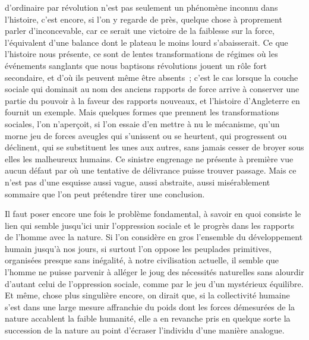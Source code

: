 \documentclass[french,twoside]{book} %
\begin{document}
d'ordinaire par révolution n'est pas seulement un phénomène inconnu dans l'histoire, c'est encore, si l'on y regarde de près, quelque chose à proprement parler d'inconcevable, car ce serait une victoire de la faiblesse sur la force, l'équivalent d'une balance dont le plateau le moins lourd s'abaisserait. Ce que l'histoire nous présente, ce sont de lentes transformations de régimes où les événements sanglants que nous baptisons révolutions jouent un rôle fort secondaire, et d'où ils peuvent même être absents ; c'est le cas lorsque la couche sociale qui dominait au nom des anciens rapports de force arrive à conserver une partie du pouvoir à la faveur des rapports nouveaux, et l'histoire d'Angleterre en fournit un exemple. Mais quelques formes que prennent les transformations sociales, l'on n'aperçoit, si l'on essaie d'en mettre à nu le mécanisme, qu'un morne jeu de forces aveugles qui s'unissent ou se heurtent, qui progressent ou déclinent, qui se substituent les unes aux autres, sans jamais cesser de broyer sous elles les malheureux humains. Ce sinistre engrenage ne présente à première vue aucun défaut par où une tentative de délivrance puisse trouver passage. Mais ce n'est pas d'une esquisse aussi vague, aussi abstraite, aussi misérablement sommaire que l'on peut prétendre tirer une conclusion.\par
Il faut poser encore une fois le problème fondamental, à savoir en quoi consiste le lien qui semble jusqu'ici unir l'oppression sociale et le progrès dans les rapports de l'homme avec la nature. Si l'on considère en gros l'ensemble du développement humain jusqu'à nos jours, si surtout l'on oppose les peuplades primitives, organisées presque sans inégalité, à notre civilisation actuelle, il semble que l'homme ne puisse parvenir à alléger le joug des nécessités naturelles sans alourdir d'autant celui de l'oppression sociale, comme par le jeu d'un mystérieux équilibre. Et même, chose plus singulière encore, on dirait que, si la collectivité humaine s'est dans une large mesure affranchie du poids dont les forces démesurées de la nature accablent la faible humanité, elle a en revanche pris en quelque sorte la succession de la nature au point d'écraser l'individu d'une manière analogue.\par
\end{document}
